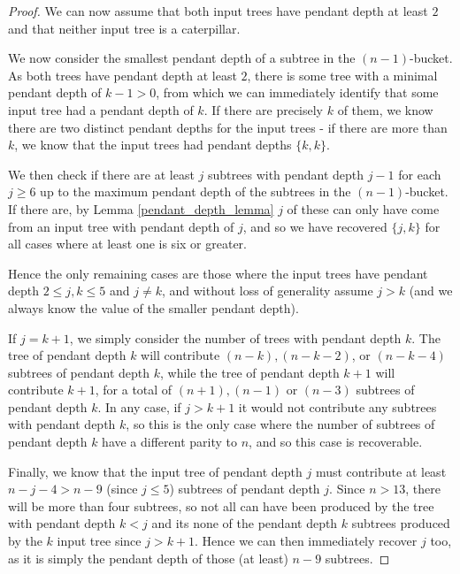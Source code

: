 \documentclass[10pt,a4paper]{amsart}
\begin{document}
\begin{proof}
    We can now assume that both input trees have pendant depth at least $2$ and that neither input tree is a caterpillar.

    We now consider the smallest pendant depth of a subtree in the $(n-1)$-bucket. As both trees have pendant depth at least $2$, there is some tree with a minimal pendant depth of $k-1>0$, from which we can immediately identify that some input tree had a pendant depth of $k$. If there are precisely $k$ of them, we know there are two distinct pendant depths for the input trees - if there are more than $k$, we know that the input trees had pendant depths $\{k,k\}$. 

    We then check if there are at least $j$ subtrees with pendant depth $j-1$ for each $j \ge 6$ up to the maximum pendant depth of the subtrees in the $(n-1)$-bucket. If there are, by Lemma \ref{pendant_depth_lemma} $j$ of these can only have come from an input tree with pendant depth of $j$, and so we have recovered $\{j,k\}$ for all cases where at least one is six or greater.

    Hence the only remaining cases are those where the input trees have pendant depth $2 \le j,k \le 5$ and $j \ne k$, and without loss of generality assume $j>k$ (and we always know the value of the smaller pendant depth).

    If $j=k+1$, we simply consider the number of trees with pendant depth $k$. The tree of pendant depth $k$ will contribute $(n-k), (n-k-2)$, or $(n-k-4)$ subtrees of pendant depth $k$, while the tree of pendant depth $k+1$ will contribute $k+1$, for a total of $(n+1), (n-1)$ or $(n-3)$ subtrees of pendant depth $k$. In any case, if $j>k+1$ it would not contribute any subtrees with pendant depth $k$, so this is the only case where the number of subtrees of pendant depth $k$ have a different parity to $n$, and so this case is recoverable.

    Finally, we know that the input tree of pendant depth $j$ must contribute at least $n-j-4>n-9$ (since $j \le 5$) subtrees of pendant depth $j$. Since $n>13$, there will be more than four subtrees, so not all can have been produced by the tree with pendant depth $k<j$ and its none of the pendant depth $k$ subtrees produced by the $k$ input tree since $j>k+1$. Hence we can then immediately recover $j$ too, as it is simply the pendant depth of those (at least) $n-9$ subtrees.
\end{proof}
\end{document}
